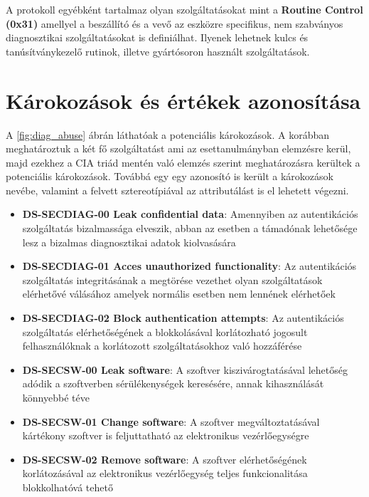 A protokoll egyébként tartalmaz olyan szolgáltatásokat mint a \textbf{Routine Control (0x31)} amellyel a beszállító és a vevő az eszközre specifikus, nem szabványos diagnosztikai szolgáltatásokat is definiálhat. Ilyenek lehetnek kulcs és tanúsítványkezelő rutinok, illetve gyártósoron használt szolgáltatások.

\section{Károkozások és értékek azonosítása}

A \ref{fig:diag_abuse} ábrán láthatóak a potenciális károkozások. A korábban meghatároztuk a két fő szolgáltatást ami az esettanulmányban elemzésre kerül, majd ezekhez a CIA triád mentén való elemzés szerint meghatározásra kerültek a potenciális károkozások. Továbbá egy egy azonosító is került a károkozások nevébe, valamint a felvett sztereotípiával az attributálást is el lehetett végezni.

\begin{itemize}
	\item \textbf{DS-SECDIAG-00 Leak confidential data}: Amennyiben az autentikációs szolgáltatás bizalmassága elveszik, abban az esetben a támadónak lehetősége lesz a bizalmas diagnosztikai adatok kiolvasására
	\item \textbf{DS-SECDIAG-01 Acces unauthorized functionality}: Az autentikációs szolgáltatás integritásának a megtörése vezethet olyan szolgáltatások elérhetővé válásához amelyek normális esetben nem lennének elérhetőek
	\item \textbf{DS-SECDIAG-02 Block authentication attempts}: Az autentikációs szolgáltatás elérhetőségének a blokkolásával korlátozható jogosult felhasználóknak a korlátozott szolgáltatásokhoz való hozzáférése
	\item \textbf{DS-SECSW-00 Leak software}: A szoftver kiszivárogtatásával lehetőség adódik a szoftverben sérülékenységek keresésére, annak kihasználását könnyebbé téve
	\item \textbf{DS-SECSW-01 Change software}: A szoftver megváltoztatásával kártékony szoftver is feljuttatható az elektronikus vezérlőegységre
	\item \textbf{DS-SECSW-02 Remove software}: A szoftver elérhetőségének korlátozásával az elektronikus vezérlőegység teljes funkcionalitása blokkolhatóvá tehető
\end{itemize}

